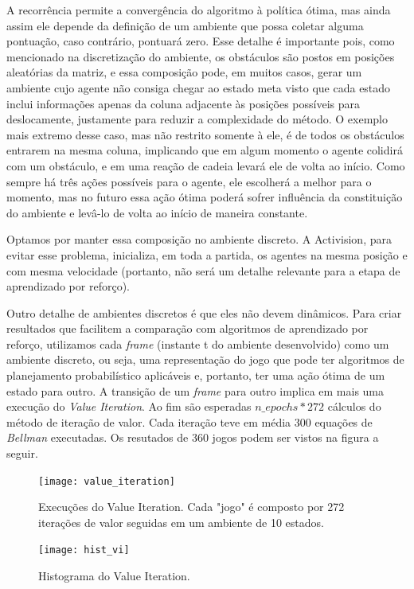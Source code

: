 \documentclass[letterpaper]{article} %
\begin{document}
A recorrência permite a convergência do algoritmo à política ótima, mas ainda assim ele depende da definição de um ambiente que possa coletar alguma pontuação, caso contrário, pontuará zero. Esse detalhe é importante pois, como mencionado na discretização do ambiente, os obstáculos são postos em posições aleatórias da matriz, e essa composição pode, em muitos casos, gerar um ambiente cujo agente não consiga chegar ao estado meta visto que cada estado inclui informações apenas da coluna adjacente às posições possíveis para deslocamente, justamente para reduzir a complexidade do método. O exemplo mais extremo desse caso, mas não restrito somente à ele, é de todos os obstáculos entrarem na mesma coluna, implicando que em algum momento o agente colidirá com um obstáculo, e em uma reação de cadeia levará ele de volta ao início. Como sempre há três ações possíveis para o agente, ele escolherá a melhor para o momento, mas no futuro essa ação ótima poderá sofrer influência da constituição do ambiente e levâ-lo de volta ao início de maneira constante. 

Optamos por manter essa composição no ambiente discreto. A Activision, para evitar esse problema, inicializa, em toda a partida, os agentes na mesma posição e com mesma velocidade (portanto, não será um detalhe relevante para a etapa de aprendizado por reforço).

Outro detalhe de ambientes discretos é que eles não devem dinâmicos. Para criar resultados que facilitem a comparação com algoritmos de aprendizado por reforço, utilizamos cada \textit{frame} (instante t do ambiente desenvolvido) como um ambiente discreto, ou seja, uma representação do jogo que pode ter algoritmos de planejamento probabilístico aplicáveis e, portanto, ter uma ação ótima de um estado para outro. A transição de um \textit{frame} para outro implica em mais uma execução do \textit{Value Iteration}. Ao fim são esperadas $n\_epochs * 272$  cálculos do método de iteração de valor. Cada iteração teve em média 300 equações de \textit{Bellman} executadas. Os resutados de 360 jogos podem ser vistos na figura a seguir.

\begin{figure}[h]
	\center
	\texttt{[image: value\_iteration]}
    \caption{Execuções do Value Iteration. Cada "jogo" é composto por 272 iterações de valor seguidas em um ambiente de 10 estados.}
\end{figure}

\begin{figure}[h]
	\center
	\texttt{[image: hist\_vi]}
    \caption{Histograma do Value Iteration.}
\end{figure}
\end{document}
